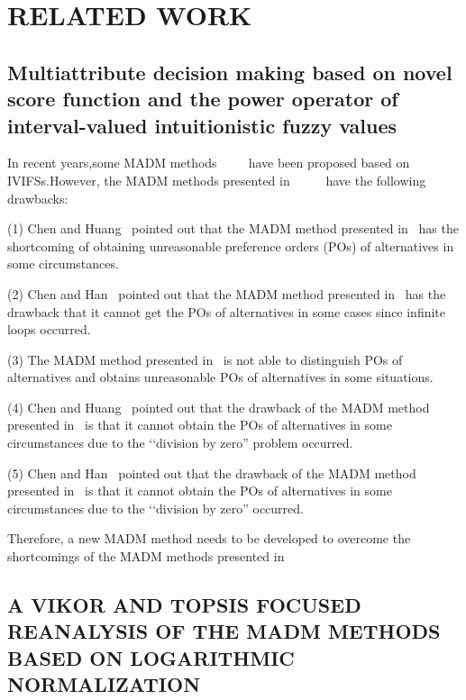 \documentclass[twocolumn]{IEEEtran}
\begin{document}
\section{RELATED WORK}


\subsection{Multiattribute decision making based on novel score function and the power operator of interval-valued intuitionistic fuzzy values}

In recent years,some MADM methods~\cite{chen2015}~\cite{chen2017}~\cite{chen2021}~\cite{chen2010}~\cite{Zhao2011}have been proposed based on IVIFSs.However, the MADM methods presented in~\cite{chen2015}~\cite{chen2017}~\cite{chen2021}~\cite{chen2010}~\cite{Zhao2011} have the following drawbacks:

    (1) Chen and Huang~\cite{chen2017_2} pointed out that the MADM method presented in~\cite{chen2015} has the shortcoming of obtaining unreasonable preference orders (POs) of alternatives in some circumstances.
    
    (2) Chen and Han~\cite{chen2018} pointed out that the MADM method presented in~\cite{chen2017} has the drawback that it cannot get the POs of alternatives in some cases since infinite loops occurred.
    
    (3) The MADM method presented in~\cite{chen2021} is not able to distinguish POs of alternatives and obtains unreasonable POs of alternatives in some situations.
    
    (4) Chen and Huang~\cite{chen2017_2} pointed out that the drawback of the MADM method presented in~\cite{chen2010} is that it cannot obtain the POs of alternatives in some circumstances due to the ‘‘division by zero” problem occurred.
    
    (5) Chen and Han~\cite{chen2018} pointed out that the drawback of the MADM method presented in~\cite{Zhao2011} is that it cannot obtain the POs of alternatives in some circumstances due to the ‘‘division by zero” occurred.

Therefore, a new MADM method needs to be developed to overcome the shortcomings of the MADM methods presented in~\cite{chen2015}~\cite{chen2017}~\cite{chen2021}~\cite{chen2010}~\cite{Zhao2011}

\subsection{A VIKOR AND TOPSIS FOCUSED REANALYSIS OF THE MADM 
METHODS BASED ON LOGARITHMIC NORMALIZATION}
\end{document}
